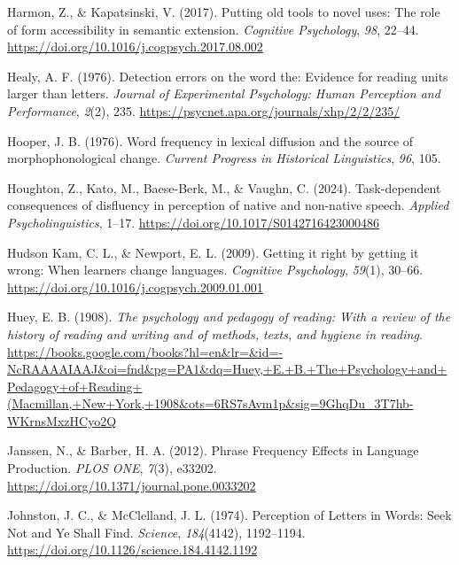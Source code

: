 \documentclass[
  12pt,
  letterpaper,
]{scrreport}
\newlength{\cslhangindent}
\newenvironment{CSLReferences}[2] %
 {\begin{list}{}{%
  \setlength{\itemindent}{0pt}
  \setlength{\leftmargin}{0pt}
  \setlength{\parsep}{0pt}
  \ifodd #1
   \setlength{\leftmargin}{\cslhangindent}
   \setlength{\itemindent}{-1\cslhangindent}
  \fi
  \setlength{\itemsep}{#2\baselineskip}}}
 {\end{list}}
\begin{document}
\begin{CSLReferences}{1}{0}
Harmon, Z., \& Kapatsinski, V. (2017). Putting old tools to novel uses:
The role of form accessibility in semantic extension. \emph{Cognitive
Psychology}, \emph{98}, 22--44.
\url{https://doi.org/10.1016/j.cogpsych.2017.08.002}

Healy, A. F. (1976). Detection errors on the word the: Evidence for
reading units larger than letters. \emph{Journal of Experimental
Psychology: Human Perception and Performance}, \emph{2}(2), 235.
\url{https://psycnet.apa.org/journals/xhp/2/2/235/}

Hooper, J. B. (1976). Word frequency in lexical diffusion and the source
of morphophonological change. \emph{Current Progress in Historical
Linguistics}, \emph{96}, 105.

Houghton, Z., Kato, M., Baese-Berk, M., \& Vaughn, C. (2024).
Task-dependent consequences of disfluency in perception of native and
non-native speech. \emph{Applied Psycholinguistics}, 1--17.
\url{https://doi.org/10.1017/S0142716423000486}

Hudson Kam, C. L., \& Newport, E. L. (2009). Getting it right by getting
it wrong: When learners change languages. \emph{Cognitive Psychology},
\emph{59}(1), 30--66.
\url{https://doi.org/10.1016/j.cogpsych.2009.01.001}

Huey, E. B. (1908). \emph{The psychology and pedagogy of reading: With a
review of the history of reading and writing and of methods, texts, and
hygiene in reading}.
\url{https://books.google.com/books?hl=en&lr=&id=-NcRAAAAIAAJ&oi=fnd&pg=PA1&dq=Huey,+E.+B.+The+Psychology+and+Pedagogy+of+Reading+(Macmillan,+New+York,+1908&ots=6RS7sAvm1p&sig=9GhqDu_3T7hb-WKrnsMxzHCyo2Q}

Janssen, N., \& Barber, H. A. (2012). Phrase Frequency Effects in
Language Production. \emph{PLOS ONE}, \emph{7}(3), e33202.
\url{https://doi.org/10.1371/journal.pone.0033202}

Johnston, J. C., \& McClelland, J. L. (1974). Perception of Letters in
Words: Seek Not and Ye Shall Find. \emph{Science}, \emph{184}(4142),
1192--1194. \url{https://doi.org/10.1126/science.184.4142.1192}


\end{CSLReferences}
\end{document}
